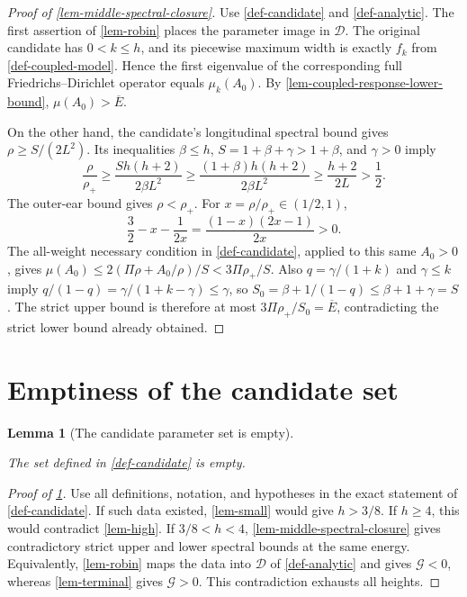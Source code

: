 \documentclass[11pt,a4paper]{article}
\theoremstyle{proofmanuscript}
\newtheorem{lemma}[theorem]{Lemma}
\begin{document}
\begin{proof}[Proof of \ref{lem-middle-spectral-closure}]

Use \ref{def-candidate} and \ref{def-analytic}. The first assertion of \ref{lem-robin} places the parameter image in \(\mathcal D\). The original candidate has \(0<k\le h\), and its piecewise maximum width is exactly \(f_k\) from \ref{def-coupled-model}. Hence the first eigenvalue of the corresponding full Friedrichs--Dirichlet operator equals \(\mu_k(A_0)\). By \ref{lem-coupled-response-lower-bound}, \(\mu(A_0)>\overline E\).

On the other hand, the candidate's longitudinal spectral bound gives \(\rho\ge S/(2L^2)\). Its inequalities \(\beta\le h\), \(S=1+\beta+\gamma>1+\beta\), and \(\gamma>0\) imply \[
\frac\rho{\rho_+}\ge\frac{Sh(h+2)}{2\beta L^2}
\ge\frac{(1+\beta)h(h+2)}{2\beta L^2}
\ge\frac{h+2}{2L}>\frac12.
\] The outer-ear bound gives \(\rho<\rho_+\). For \(x=\rho/\rho_+\in(1/2,1)\), \[
\frac32-x-\frac1{2x}=\frac{(1-x)(2x-1)}{2x}>0.
\] The all-weight necessary condition in \ref{def-candidate}, applied to this same \(A_0>0\), gives \(\mu(A_0)\le2(\Pi\rho+A_0/\rho)/S<3\Pi\rho_+/S\). Also \(q=\gamma/(1+k)\) and \(\gamma\le k\) imply \(q/(1-q)=\gamma/(1+k-\gamma)\le\gamma\), so \(S_0=\beta+1/(1-q)\le\beta+1+\gamma=S\). The strict upper bound is therefore at most \(3\Pi\rho_+/S_0=\overline E\), contradicting the strict lower bound already obtained.

\end{proof}


\section{Emptiness of the candidate set}

\begin{lemma}[The candidate parameter set is empty]\label{lem-no-candidate}

The set defined in \ref{def-candidate} is empty.

\end{lemma}

\begin{proof}[Proof of \ref{lem-no-candidate}]

Use all definitions, notation, and hypotheses in the exact statement of \ref{def-candidate}. If such data existed, \ref{lem-small} would give \(h>3/8\). If \(h\ge4\), this would contradict \ref{lem-high}. If \(3/8<h<4\), \ref{lem-middle-spectral-closure} gives contradictory strict upper and lower spectral bounds at the same energy. Equivalently, \ref{lem-robin} maps the data into \(\mathcal D\) of \ref{def-analytic} and gives \(\mathcal G<0\), whereas \ref{lem-terminal} gives \(\mathcal G>0\). This contradiction exhausts all heights.

\end{proof}
\end{document}
